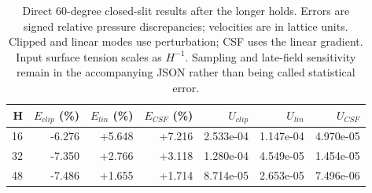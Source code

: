 \begin{table}[htbp]\centering\small
\begin{tabular}{rrrrrrr}\toprule
H & $E_{clip}$ (\%) & $E_{lin}$ (\%) & $E_{CSF}$ (\%) & $U_{clip}$ & $U_{lin}$ & $U_{CSF}$ \\
\midrule
16 & -6.276 & +5.648 & +7.216 & 2.533e-04 & 1.147e-04 & 4.970e-05 \\
32 & -7.350 & +2.766 & +3.118 & 1.280e-04 & 4.549e-05 & 1.454e-05 \\
48 & -7.486 & +1.655 & +1.714 & 8.714e-05 & 2.653e-05 & 7.496e-06 \\
\bottomrule\end{tabular}
\caption{Direct 60-degree closed-slit results after the longer holds.
Errors are signed relative pressure discrepancies; velocities are in lattice
units. Clipped and linear modes use perturbation; CSF uses the linear gradient.
Input surface tension scales as $H^{-1}$. Sampling and late-field sensitivity
remain in the accompanying JSON rather than being called statistical error.}
\end{table}
